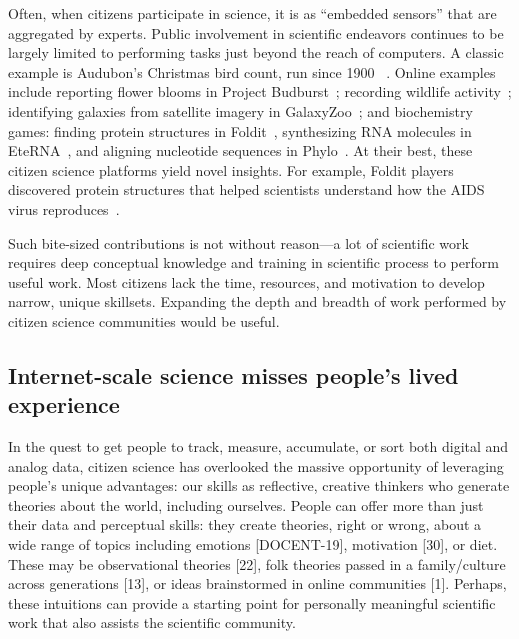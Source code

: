 Often, when citizens participate in science, it is as “embedded sensors” that 
are aggregated by experts. Public involvement in scientific endeavors continues
to be largely limited to performing tasks just beyond the reach of computers.
A classic example is Audubon’s Christmas bird count, run since 1900
~\cite{Audubon2016}. Online examples include reporting flower blooms in
Project Budburst~\cite{BoulderColorado2016}; recording wildlife activity~\cite{Faridani2009a};
identifying galaxies from satellite imagery in GalaxyZoo~\cite{Zooniverse2007}; and biochemistry games: finding protein structures in
Foldit~\cite{Cooper2010}, synthesizing RNA molecules in EteRNA~\cite{Lee2014}, and aligning 
nucleotide sequences in Phylo~\cite{Kawrykow2012}. At their
best, these citizen science platforms yield novel insights.
For example, Foldit players discovered protein structures
that helped scientists understand how the AIDS virus reproduces~\cite{Coren2011}. 

 Such bite-sized contributions is not without reason—a lot of
scientific work requires deep conceptual knowledge and 
training in scientific process to perform useful work. Most
citizens lack the time, resources, and motivation to develop
narrow, unique skillsets. Expanding the depth and breadth of work 
performed by citizen science communities would be useful.

\subsection{Internet-scale science misses people’s lived experience}
In the quest to get people to track, measure, accumulate, or
sort both digital and analog data, citizen science has overlooked the massive opportunity of leveraging people’s
unique advantages: our skills as reflective, creative thinkers
who generate theories about the world, including ourselves.
People can offer more than just their data and perceptual
skills: they create theories, right or wrong, about a wide
range of topics including emotions [DOCENT-19], motivation [30], or
diet. These may be observational theories [22], folk theories
passed in a family/culture across generations [13], or ideas
brainstormed in online communities [1]. Perhaps, these intuitions can provide a starting point for personally meaningful
scientific work that also assists the scientific community.

